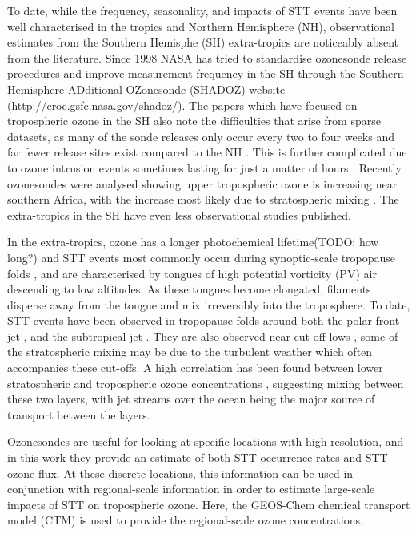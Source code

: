 \documentclass{article}
\begin{document}
    To date, while the frequency, seasonality, and impacts of STT events have been well characterised in the tropics and Northern Hemisphere (NH), observational estimates from the Southern Hemisphe (SH) extra-tropics are noticeably absent from the literature. 
    Since 1998 NASA has tried to standardise ozonesonde release procedures and improve measurement frequency in the SH through the Southern Hemisphere ADditional OZonesonde (SHADOZ) website (\url{http://croc.gsfc.nasa.gov/shadoz/}).
    The papers which have focused on tropospheric ozone in the SH also note the difficulties that arise from sparse datasets, as many of the sonde releases only occur every two to four weeks and far fewer release sites exist compared to the NH \citep{Liu2015, Thompson2014, Mze2010}.
    This is further complicated due to ozone intrusion events sometimes lasting for just a matter of hours \citep{Tang2012}.
    Recently ozonesondes were analysed showing upper tropospheric ozone is increasing near southern Africa, with the increase most likely due to stratospheric mixing \citep{Liu2015, Thompson2014}. 
    The extra-tropics in the SH have even less observational studies published.
    
    In the extra-tropics, ozone has a longer photochemical lifetime(TODO: how long?) and STT events most commonly occur during synoptic-scale tropopause folds \citep{Sprenger2003, Tang2012}, and are characterised by tongues of high potential vorticity (PV) air descending to low altitudes.
    As these tongues become elongated, filaments disperse away from the tongue and mix irreversibly into the troposphere.
    To date, STT events have been observed in tropopause folds around both the polar front jet \citep{Vaughan1994, Beekmann1997}, and the subtropical jet \citep{Baray2000}.
    They are also observed near cut-off lows \citep{Price1993, Wirth1995}, some of the stratospheric mixing may be due to the turbulent weather which often accompanies these cut-offs.
    A high correlation has been found between lower stratospheric and tropospheric ozone concentrations \citep{Terao2008}, suggesting mixing between these two layers, with jet streams over the ocean being the major source of transport between the layers.
    
    Ozonesondes are useful for looking at specific locations with high resolution, and in this work they provide an estimate of both STT occurrence rates and STT ozone flux.
    At these discrete locations, this information can be used in conjunction with regional-scale information in order to estimate large-scale impacts of STT on tropospheric ozone. Here, the 
    GEOS-Chem chemical transport model (CTM) is used to provide the regional-scale ozone concentrations.
  
\end{document}
